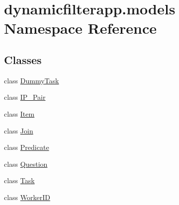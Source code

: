 \hypertarget{namespacedynamicfilterapp_1_1models}{}\section{dynamicfilterapp.\+models Namespace Reference}
\label{namespacedynamicfilterapp_1_1models}
\subsection*{Classes}
\begin{DoxyCompactItemize}
\item 
class \hyperlink{classdynamicfilterapp_1_1models_1_1_dummy_task}{Dummy\+Task}
\item 
class \hyperlink{classdynamicfilterapp_1_1models_1_1_i_p___pair}{I\+P\+\_\+\+Pair}
\item 
class \hyperlink{classdynamicfilterapp_1_1models_1_1_item}{Item}
\item 
class \hyperlink{classdynamicfilterapp_1_1models_1_1_join}{Join}
\item 
class \hyperlink{classdynamicfilterapp_1_1models_1_1_predicate}{Predicate}
\item 
class \hyperlink{classdynamicfilterapp_1_1models_1_1_question}{Question}
\item 
class \hyperlink{classdynamicfilterapp_1_1models_1_1_task}{Task}
\item 
class \hyperlink{classdynamicfilterapp_1_1models_1_1_worker_i_d}{Worker\+ID}
\end{DoxyCompactItemize}
